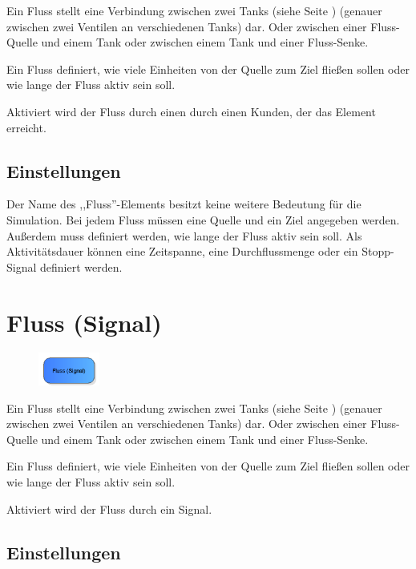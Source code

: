 Ein Fluss stellt eine Verbindung zwischen zwei Tanks (siehe Seite \pageref{ref:ModelElementTank}) 
(genauer zwischen zwei Ventilen an verschiedenen Tanks) dar.
Oder zwischen einer Fluss-Quelle und einem Tank oder zwischen einem Tank und einer Fluss-Senke.

Ein Fluss definiert, wie viele Einheiten von der Quelle zum Ziel fließen sollen oder wie
lange der Fluss aktiv sein soll.

Aktiviert wird der Fluss durch einen durch einen Kunden, der das Element erreicht.

\subsection*{Einstellungen}

Der Name des ,,Fluss''-Elements besitzt keine weitere Bedeutung für die Simulation.
Bei jedem Fluss müssen eine Quelle und ein Ziel angegeben werden.
Außerdem muss definiert werden, wie lange der Fluss aktiv sein soll. Als Aktivitätsdauer
können eine Zeitspanne, eine Durchflussmenge oder ein Stopp-Signal definiert werden.


\section{Fluss (Signal)}
\label{ref:ModelElementTankFlowBySignal}

\begin{figure}
\vspace{-22pt}
\includegraphics[width=2cm]{imageModelElementTankFlowBySignal.png}
\vspace{-22pt}
\end{figure}

Ein Fluss stellt eine Verbindung zwischen zwei Tanks (siehe Seite \pageref{ref:ModelElementTank}) 
(genauer zwischen zwei Ventilen an verschiedenen Tanks) dar.
Oder zwischen einer Fluss-Quelle und einem Tank oder zwischen einem Tank und einer Fluss-Senke.

Ein Fluss definiert, wie viele Einheiten von der Quelle zum Ziel fließen sollen oder wie
lange der Fluss aktiv sein soll.

Aktiviert wird der Fluss durch ein Signal.

\subsection*{Einstellungen}


